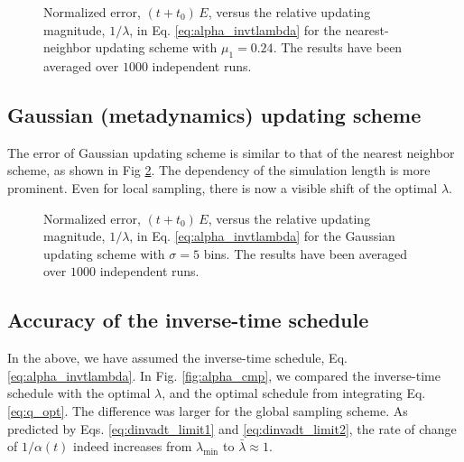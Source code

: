 \documentclass[reprint, floatfix]{revtex4-1}
\begin{document}
\begin{figure}[h]
\begin{center}
  \caption{
    \label{fig:err_nnbr}
    Normalized error, $(t + t_0) \, E$,
    versus the %
    relative updating magnitude,
    $1/\lambda$,
    in Eq. \eqref{eq:alpha_invtlambda}
    for the nearest-neighbor updating scheme with $\mu_1 = 0.24$.
    The results have been averaged over $1000$ independent runs.
  }
\end{center}
\end{figure}





\subsection{Gaussian (metadynamics) updating scheme}


The error of Gaussian updating scheme is similar to
that of the nearest neighbor scheme,
as shown in Fig \ref{fig:err_sig5}.
%
The dependency of the simulation length is more prominent.
%
Even for local sampling,
there is now a visible shift of the optimal $\lambda$.


\begin{figure}[h]
\begin{center}
  \caption{
    \label{fig:err_sig5}
    Normalized error, $(t + t_0) \, E$,
    versus the %
    relative updating magnitude,
    $1/\lambda$,
    in Eq. \eqref{eq:alpha_invtlambda}
    for the Gaussian updating scheme with $\sigma = 5$ bins.
    The results have been averaged over $1000$ independent runs.
  }
\end{center}
\end{figure}



\subsection{Accuracy of the inverse-time schedule}



In the above, we have assumed the inverse-time schedule,
Eq. \eqref{eq:alpha_invtlambda}.
%
In Fig. \ref{fig:alpha_cmp},
we compared the inverse-time schedule
with the optimal $\lambda$,
and the optimal schedule from integrating
Eq. \eqref{eq:q_opt}.
%
The difference was larger for the global sampling scheme.
%
As predicted by
Eqs. \eqref{eq:dinvadt_limit1} and \eqref{eq:dinvadt_limit2},
the rate of change of $1/\alpha(t)$
indeed increases from $\lambda_{\min}$
to $\bar \lambda \approx 1$.
\end{document}
